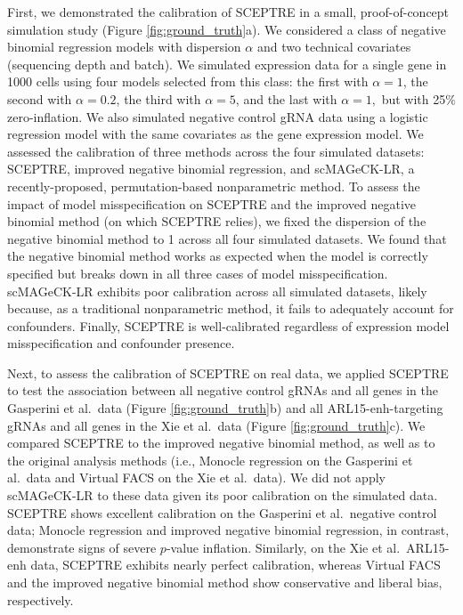 \documentclass{nature}
\begin{document}
First, we demonstrated the calibration of SCEPTRE in a small, proof-of-concept simulation study (Figure \ref{fig:ground_truth}a). We considered a class of negative binomial regression models with dispersion $\alpha$ and two technical covariates (sequencing depth and batch). We simulated expression data for a single gene in 1000 cells using four models selected from this class: the first with $\alpha = 1$, the second with $\alpha = 0.2$, the third with $\alpha = 5$, and the last with $\alpha = 1,$ but with 25$\%$ zero-inflation. We also simulated negative control gRNA data using a logistic regression model with the same covariates as the gene expression model. We assessed the calibration of three methods across the four simulated datasets: SCEPTRE, improved negative binomial regression, and scMAGeCK-LR,\cite{Yang2020} a recently-proposed, permutation-based nonparametric method. To assess the impact of model misspecification on SCEPTRE and the improved negative binomial method (on which SCEPTRE relies), we fixed the dispersion of the negative binomial method to 1 across all four simulated datasets. We found that the negative binomial method works as expected when the model is correctly specified but breaks down in all three cases of model misspecification. scMAGeCK-LR exhibits poor calibration across all simulated datasets, likely because, as a traditional nonparametric method, it fails to adequately account for confounders. Finally, SCEPTRE is well-calibrated regardless of expression model misspecification and confounder presence.

Next, to assess the calibration of SCEPTRE on real data, we applied SCEPTRE to test the association between all negative control gRNAs and all genes in the Gasperini et al.\ data (Figure \ref{fig:ground_truth}b) and all ARL15-enh-targeting gRNAs and all genes in the Xie et al.\ data (Figure \ref{fig:ground_truth}c). We compared SCEPTRE to the improved negative binomial method, as well as to the original analysis methods (i.e., Monocle regression on the Gasperini et al.\ data and Virtual FACS on the Xie et al.\ data). We did not apply scMAGeCK-LR to these data given its poor calibration on the simulated data. SCEPTRE shows excellent calibration on the Gasperini et al.\ negative control data; Monocle regression and improved negative binomial regression, in contrast, demonstrate signs of severe $p$-value inflation. Similarly, on the Xie et al.\ ARL15-enh data, SCEPTRE exhibits nearly perfect calibration, whereas Virtual FACS and the improved negative binomial method show conservative and liberal bias, respectively.
\end{document}
